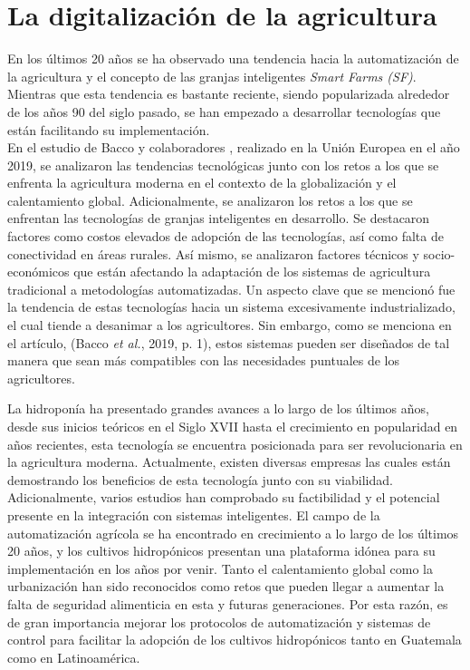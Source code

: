 \section{La digitalización de la agricultura}
En los últimos 20 años se ha observado una tendencia hacia la automatización de la agricultura y el concepto de las granjas inteligentes \textit{Smart Farms (SF)}. Mientras que esta tendencia es bastante reciente, siendo popularizada alrededor de los años 90 del siglo pasado, se han empezado a desarrollar tecnologías que están facilitando su implementación. 
\\ En el estudio de Bacco y colaboradores \cite{bacco_digitisation_2019}, realizado en la Unión Europea en el año 2019, se analizaron las tendencias tecnológicas junto con los retos a los que se enfrenta la agricultura moderna en el contexto de la globalización y el calentamiento global. Adicionalmente, se analizaron los retos a los que se enfrentan las tecnologías de granjas inteligentes en desarrollo. Se destacaron factores como costos elevados de adopción de las tecnologías, así como falta de conectividad en áreas rurales. Así mismo, se analizaron factores técnicos y socio-económicos que están afectando la adaptación de los sistemas de agricultura tradicional a metodologías automatizadas. Un aspecto clave que se mencionó fue la tendencia de estas tecnologías hacia un sistema excesivamente industrializado, el cual tiende a desanimar a los agricultores. Sin embargo, como se menciona en el artículo,  (Bacco \textit{et al.}, 2019, p. 1), estos sistemas pueden ser diseñados de tal manera que sean más compatibles con las necesidades puntuales de los agricultores. %

\indent La hidroponía ha presentado grandes avances a lo largo de los últimos años, desde sus inicios teóricos en el Siglo XVII hasta el crecimiento en popularidad en años recientes, esta tecnología se encuentra posicionada para ser revolucionaria en la agricultura moderna. Actualmente, existen diversas empresas las cuales están demostrando los beneficios de esta tecnología junto con su viabilidad. Adicionalmente, varios estudios han comprobado su factibilidad y el potencial presente en la integración con sistemas inteligentes. El campo de la automatización agrícola se ha encontrado en crecimiento a lo largo de los últimos 20 años, y los cultivos hidropónicos presentan una plataforma idónea para su implementación en los años por venir. Tanto el calentamiento global como la urbanización han sido reconocidos como retos que pueden llegar a aumentar la falta de seguridad alimenticia en esta y futuras generaciones. Por esta razón, es de gran importancia mejorar los protocolos de automatización y sistemas de control para facilitar la adopción de los cultivos hidropónicos tanto en Guatemala como en Latinoamérica.
